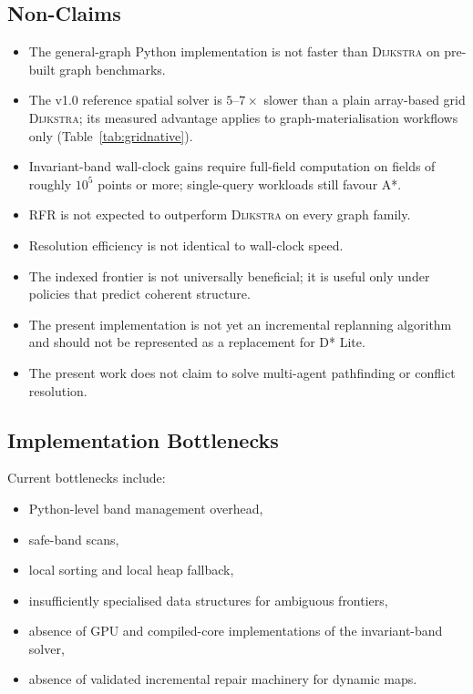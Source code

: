 \documentclass[11pt]{article}
\newcommand{\RFR}{\textsc{RFR}}
\newcommand{\Dijkstra}{\textsc{Dijkstra}}
\begin{document}
\subsection{Non-Claims}

\begin{itemize}
  \item The general-graph Python implementation is not faster than \Dijkstra{} on pre-built graph benchmarks.
  \item The v1.0 reference spatial solver is $5$--$7\times$ slower than a plain array-based grid \Dijkstra{}; its measured advantage applies to graph-materialisation workflows only (Table~\ref{tab:gridnative}).
  \item Invariant-band wall-clock gains require full-field computation on fields of roughly $10^5$ points or more; single-query workloads still favour A*.
  \item \RFR{} is not expected to outperform \Dijkstra{} on every graph family.
  \item Resolution efficiency is not identical to wall-clock speed.
  \item The indexed frontier is not universally beneficial; it is useful only under policies that predict coherent structure.
  \item The present implementation is not yet an incremental replanning algorithm and should not be represented as a replacement for D* Lite.
  \item The present work does not claim to solve multi-agent pathfinding or conflict resolution.
\end{itemize}

\subsection{Implementation Bottlenecks}

Current bottlenecks include:

\begin{itemize}
  \item Python-level band management overhead,
  \item safe-band scans,
  \item local sorting and local heap fallback,
  \item insufficiently specialised data structures for ambiguous frontiers,
  \item absence of GPU and compiled-core implementations of the invariant-band solver,
  \item absence of validated incremental repair machinery for dynamic maps.
\end{itemize}
\end{document}
